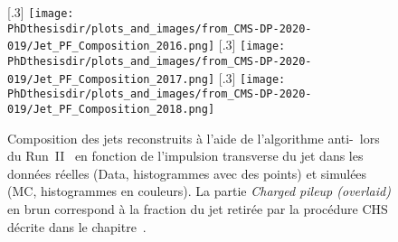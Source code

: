 \begin{figure}[h]
\centering
{}[.3\textwidth]
{\texttt{[image: \\PhDthesisdir/plots\_and\_images/from\_CMS-DP-2020-019/Jet\_PF\_Composition\_2016.png]}}
\hfill
{}[.3\textwidth]
{\texttt{[image: \\PhDthesisdir/plots\_and\_images/from\_CMS-DP-2020-019/Jet\_PF\_Composition\_2017.png]}}
\hfill
{}[.3\textwidth]
{\texttt{[image: \\PhDthesisdir/plots\_and\_images/from\_CMS-DP-2020-019/Jet\_PF\_Composition\_2018.png]}}
\caption[Compositions des jets reconstruits lors du Run~II.]{Composition des jets reconstruits à l'aide de l'algorithme anti-\kT\ lors du Run~II~\cite{CMS-DP-2020-019} en fonction de l'impulsion transverse du jet dans les données réelles (Data, histogrammes avec des points) et simulées (MC, histogrammes en couleurs). La partie \emph{Charged pileup (overlaid)} en brun correspond à la fraction du jet retirée par la procédure CHS décrite dans le chapitre~.}
\label{fig-Jet_PF_Composition_RunII}
\end{figure}

